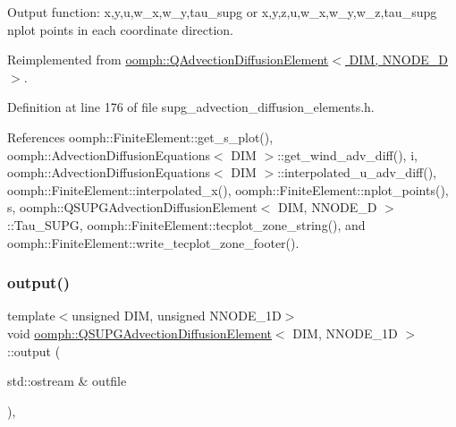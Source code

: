 Output function\+: x,y,u,w\+\_\+x,w\+\_\+y,tau\+\_\+supg or x,y,z,u,w\+\_\+x,w\+\_\+y,w\+\_\+z,tau\+\_\+supg nplot points in each coordinate direction. 



Reimplemented from \hyperlink{classoomph_1_1QAdvectionDiffusionElement_a248d31c455b267075d437ae2833540c6}{oomph\+::\+Q\+Advection\+Diffusion\+Element$<$ D\+I\+M, N\+N\+O\+D\+E\+\_\+D $>$}.



Definition at line 176 of file supg\+\_\+advection\+\_\+diffusion\+\_\+elements.\+h.



References oomph\+::\+Finite\+Element\+::get\+\_\+s\+\_\+plot(), oomph\+::\+Advection\+Diffusion\+Equations$<$ D\+I\+M $>$\+::get\+\_\+wind\+\_\+adv\+\_\+diff(), i, oomph\+::\+Advection\+Diffusion\+Equations$<$ D\+I\+M $>$\+::interpolated\+\_\+u\+\_\+adv\+\_\+diff(), oomph\+::\+Finite\+Element\+::interpolated\+\_\+x(), oomph\+::\+Finite\+Element\+::nplot\+\_\+points(), s, oomph\+::\+Q\+S\+U\+P\+G\+Advection\+Diffusion\+Element$<$ D\+I\+M, N\+N\+O\+D\+E\+\_\+D $>$\+::\+Tau\+\_\+\+S\+U\+PG, oomph\+::\+Finite\+Element\+::tecplot\+\_\+zone\+\_\+string(), and oomph\+::\+Finite\+Element\+::write\+\_\+tecplot\+\_\+zone\+\_\+footer().

\mbox{\label{classoomph_1_1QSUPGAdvectionDiffusionElement_a13469ca1c2520461e62374e600ecf84d}} 
\subsubsection{\texorpdfstring{output()}{output()}\hspace{0.1cm}{\footnotesize\ttfamily [2/4]}}
{\footnotesize\ttfamily template$<$unsigned D\+IM, unsigned N\+N\+O\+D\+E\+\_\+1D$>$ \\
void \hyperlink{classoomph_1_1QSUPGAdvectionDiffusionElement}{oomph\+::\+Q\+S\+U\+P\+G\+Advection\+Diffusion\+Element}$<$ D\+IM, N\+N\+O\+D\+E\+\_\+1D $>$\+::output (\begin{DoxyParamCaption}\item[{std\+::ostream \&}]{outfile }\end{DoxyParamCaption})\hspace{0.3cm}{\ttfamily [inline]}, {\ttfamily [virtual]}}



